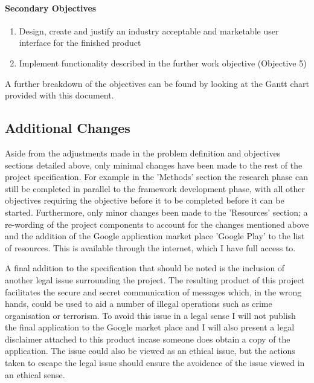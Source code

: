 \documentclass[a4paper,11pt]{article}
\begin{document}
\paragraph{Secondary Objectives}
\begin{enumerate}
  \item Design, create and justify an industry acceptable and marketable user interface for the finished product
  \item Implement functionality described in the further work objective (Objective 5)
\end{enumerate}

\vspace{3pt}
A further breakdown of the objectives can be found by looking at the Gantt chart provided with this document.

\subsection{Additional Changes}

Aside from the adjustments made in the problem definition and objectives sections detailed above, only minimal changes have been made to the rest of the project specification. For example in the 'Methods' section the research phase can still be completed in parallel to the framework development phase, with all other objectives requiring the objective before it to be completed before it can be started. Furthermore, only minor changes been made to the 'Resources' section; a re-wording of the project components to account for the changes mentioned above and the addition of the Google application market place 'Google Play' to the list of resources. This is available through the internet, which I have full access to.

A final addition to the specification that should be noted is the inclusion of another legal issue surrounding the project. The resulting product of this project facilitates the secure and secret communication of messages which, in the wrong hands, could be used to aid a number of illegal operations such as crime organisation or terrorism. To avoid this issue in a legal sense I will not publish the final application to the Google market place and I will also present a legal disclaimer attached to this product incase someone does obtain a copy of the application. The issue could also be viewed as an ethical issue, but the actions taken to escape the legal issue should ensure the avoidence of the issue viewed in an ethical sense. 
\end{document}
